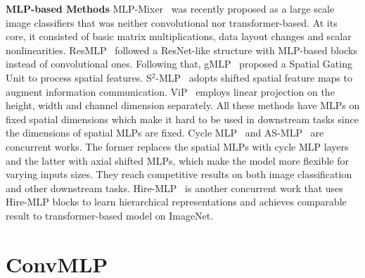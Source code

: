 \documentclass[final]{cvpr}
\begin{document}
\noindent \textbf{MLP-based Methods} MLP-Mixer~\cite{tolstikhin2021mlp} was recently proposed as a large scale image classifiers that was neither convolutional nor transformer-based. At its core, it consisted of basic matrix multiplications, data layout changes and scalar nonlinearities. ResMLP~\cite{touvron2021resmlp} followed a ResNet-like structure with MLP-based blocks instead of convolutional ones. Following that, gMLP~\cite{liu2021pay} proposed a Spatial Gating Unit to process spatial features. S$^2$-MLP~\cite{yu2021s} adopts shifted spatial feature maps to augment information communication. ViP~\cite{hou2021vision} employs linear projection on the height, width and channel dimension separately. All these methods have MLPs on fixed spatial dimensions which make it hard to be used in downstream tasks since the dimensions of spatial MLPs are fixed. Cycle MLP~\cite{chen2021cyclemlp} and AS-MLP~\cite{lian2021mlp} are concurrent works. The former replaces the spatial MLPs with cycle MLP layers and the latter with axial shifted MLPs, which make the model more flexible for varying inputs sizes. They reach competitive results on both image classification and other downstream tasks. Hire-MLP~\cite{guo2021hire} is another concurrent work that uses Hire-MLP blocks to learn hierarchical representations and achieves comparable result to transformer-based model on ImageNet.

\section{ConvMLP}
\end{document}

